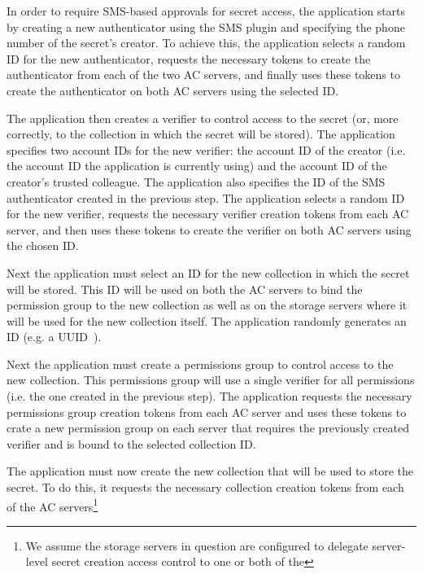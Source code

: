 \begin{packed_enum}
\item In order to require SMS-based approvals for secret access, the
  application starts by creating a new authenticator using the SMS
  plugin and specifying the phone number of the secret's creator. To
  achieve this, the application selects a random ID for the new
  authenticator, requests the necessary tokens to create the
  authenticator from each of the two AC servers, and finally uses
  these tokens to create the authenticator on both AC servers using
  the selected ID.
\item The application then creates a verifier to control access to the
  secret (or, more correctly, to the collection in which the secret
  will be stored). The application specifies two account IDs for the
  new verifier: the account ID of the creator (i.e. the account ID the
  application is currently using) and the account ID of the creator's
  trusted colleague. The application also specifies the ID of the SMS
  authenticator created in the previous step. The application selects
  a random ID for the new verifier, requests the necessary verifier
  creation tokens from each AC server, and then uses these tokens to
  create the verifier on both AC servers using the chosen ID.
\item Next the application must select an ID for the new collection in
  which the secret will be stored. This ID will be used on both the AC
  servers to bind the permission group to the new collection as well
  as on the storage servers where it will be used for the new
  collection itself. The application randomly generates an ID (e.g. a
  UUID~\cite{leach2005}).
\item Next the application must create a permissions group to control
  access to the new collection. This permissions group will use a
  single verifier for all permissions (i.e. the one created in the
  previous step). The application requests the necessary permissions
  group creation tokens from each AC server and uses these tokens to
  crate a new permission group on each server that requires the
  previously created verifier and is bound to the selected collection
  ID.
\item The application must now create the new collection that will be
  used to store the secret. To do this, it requests the necessary
  collection creation tokens from each of the AC servers\footnote{We
    assume the storage servers in question are configured to delegate
    server-level secret creation access control to one or both of the
}
\end{packed_enum}
